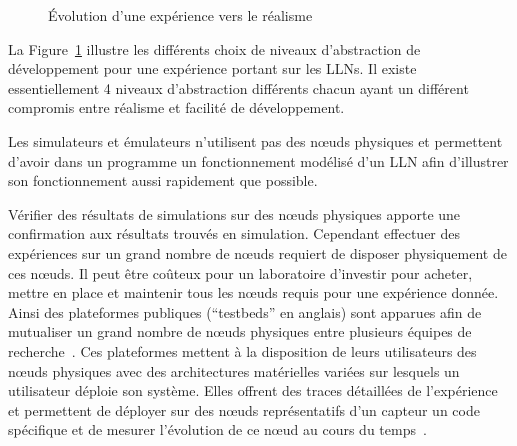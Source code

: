 \begin{figure}[ht]
\caption{Évolution d'une expérience vers le réalisme}
\label{makesense:fig:workflow}
\end{figure}

La Figure~\ref{makesense:fig:workflow} illustre les différents choix de niveaux d'abstraction de développement pour une expérience portant sur les \ac{LLN}s.
Il existe essentiellement 4 niveaux d'abstraction différents chacun ayant un différent compromis entre réalisme et facilité de développement.

Les simulateurs et émulateurs n'utilisent pas des nœuds physiques et permettent d'avoir dans un programme un fonctionnement modélisé d'un \ac{LLN} afin d'illustrer son fonctionnement aussi rapidement que possible.

Vérifier des résultats de simulations sur des nœuds physiques apporte une confirmation aux résultats trouvés en simulation.
Cependant effectuer des expériences sur un grand nombre de nœuds requiert de disposer physiquement de ces nœuds.
Il peut être coûteux pour un laboratoire d'investir pour acheter, mettre en place et maintenir tous les nœuds requis pour une expérience donnée.
Ainsi des plateformes publiques (``testbeds'' en anglais) sont apparues afin de mutualiser un grand nombre de nœuds physiques entre plusieurs équipes de recherche~\cite{doddavenkatappa2012indriya, fleury2015fit}.
Ces plateformes mettent à la disposition de leurs utilisateurs des nœuds physiques avec des architectures matérielles variées sur lesquels un utilisateur déploie son système.
Elles offrent des traces détaillées de l'expérience et permettent de déployer sur des nœuds représentatifs d'un capteur un code spécifique et de mesurer l'évolution de ce nœud au cours du temps~\cite{fleury2015fit}.

